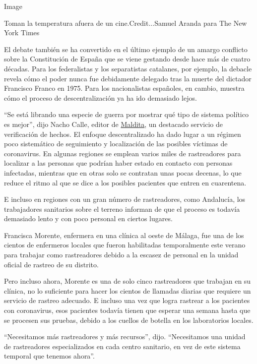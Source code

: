 Image

Toman la temperatura afuera de un cine.Credit...Samuel Aranda para The
New York Times

El debate también se ha convertido en el último ejemplo de un amargo
conflicto sobre la Constitución de España que se viene gestando desde
hace más de cuatro décadas. Para los federalistas y los separatistas
catalanes, por ejemplo, la debacle revela cómo el poder nunca fue
debidamente delegado tras la muerte del dictador Francisco Franco en
1975. Para los nacionalistas españoles, en cambio, muestra cómo el
proceso de descentralización ya ha ido demasiado lejos.

``Se está librando una especie de guerra por mostrar qué tipo de sistema
político es mejor'', dijo Nacho Calle, editor de
\href{https://maldita.es/coronavirus/}{Maldita}, un destacado servicio
de verificación de hechos. El enfoque descentralizado ha dado lugar a un
régimen poco sistemático de seguimiento y localización de las posibles
víctimas de coronavirus. En algunas regiones se emplean varios miles de
rastreadores para localizar a las personas que podrían haber estado en
contacto con personas infectadas, mientras que en otras solo se
contratan unas pocas decenas, lo que reduce el ritmo al que se dice a
los posibles pacientes que entren en cuarentena.

E incluso en regiones con un gran número de rastreadores, como
Andalucía, los trabajadores sanitarios sobre el terreno informan de que
el proceso es todavía demasiado lento y con poco personal en ciertos
lugares.

Francisca Morente, enfermera en una clínica al oeste de Málaga, fue una
de los cientos de enfermeros locales que fueron habilitadas
temporalmente este verano para trabajar como rastreadores debido a la
escasez de personal en la unidad oficial de rastreo de su distrito.

Pero incluso ahora, Morente es una de solo cinco rastreadores que
trabajan en su clínica, no lo suficiente para hacer los cientos de
llamadas diarias que requiere un servicio de rastreo adecuado. E incluso
una vez que logra rastrear a los pacientes con coronavirus, esos
pacientes todavía tienen que esperar una semana hasta que se procesen
sus pruebas, debido a los cuellos de botella en los laboratorios
locales.

``Necesitamos más rastreadores y más recursos'', dijo. ``Necesitamos una
unidad de rastreadores especializados en cada centro sanitario, en vez
de este sistema temporal que tenemos ahora''.

